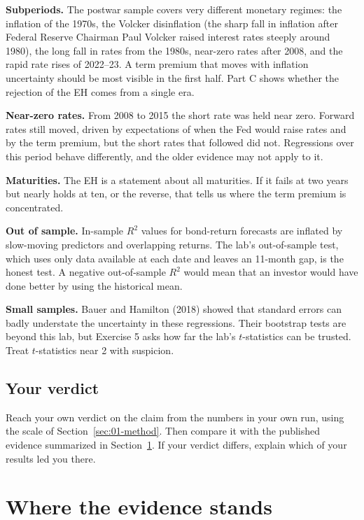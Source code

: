 \textbf{Subperiods.} The postwar sample covers very different monetary regimes: the inflation of the 1970s, the Volcker disinflation (the sharp fall in inflation after Federal Reserve Chairman Paul Volcker raised interest rates steeply around 1980), the long fall in rates from the 1980s, near-zero rates after 2008, and the rapid rate rises of 2022--23. A term premium that moves with inflation uncertainty should be most visible in the first half. Part C shows whether the rejection of the EH comes from a single era.

\textbf{Near-zero rates.} From 2008 to 2015 the short rate was held near zero. Forward rates still moved, driven by expectations of when the Fed would raise rates and by the term premium, but the short rates that followed did not. Regressions over this period behave differently, and the older evidence may not apply to it.

\textbf{Maturities.} The EH is a statement about all maturities. If it fails at two years but nearly holds at ten, or the reverse, that tells us where the term premium is concentrated.

\textbf{Out of sample.} In-sample $R^2$ values for bond-return forecasts are inflated by slow-moving predictors and overlapping returns. The lab's out-of-sample test, which uses only data available at each date and leaves an 11-month gap, is the honest test. A negative out-of-sample $R^2$ would mean that an investor would have done better by using the historical mean.

\textbf{Small samples.} Bauer and Hamilton (2018) showed that standard errors can badly understate the uncertainty in these regressions. Their bootstrap tests are beyond this lab, but Exercise 5 asks how far the lab's $t$-statistics can be trusted. Treat $t$-statistics near 2 with suspicion.

\subsection*{Your verdict}

Reach your own verdict on the claim from the numbers in your own run, using the scale of Section~\ref{sec:01-method}. Then compare it with the published evidence summarized in Section~\ref{sec:07-verdict}. If your verdict differs, explain which of your results led you there.

\section{Where the evidence stands}
\label{sec:07-verdict}

